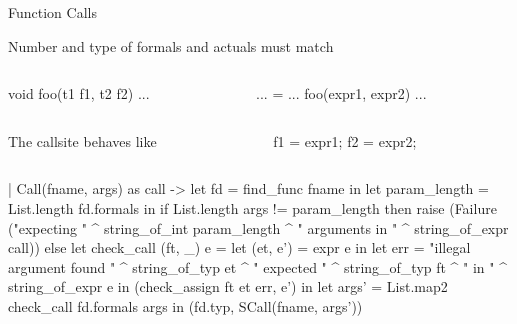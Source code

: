 \documentclass{plt}
\begin{document}
\begin{frame}[fragile=singleslide]{Function Calls}

Number and type of formals and actuals must match

\begin{columns}
\begin{column}{0.5\textwidth}
\begin{C}
void foo(t1 f1, t2 f2) { ... }
\end{C}
\end{column}
\begin{column}{0.5\textwidth}
\begin{C}
... = ... foo(expr1, expr2) ...
\end{C}
\end{column}
\end{columns}

\begin{columns}
\begin{column}{0.4\textwidth}
The callsite behaves like
\end{column}
\begin{column}{0.6\textwidth}
\begin{C}
f1 = expr1;
f2 = expr2;
\end{C}
\end{column}
\end{columns}

\begin{ocaml}
| Call(fname, args) as call -> 
    let fd = find_func fname in
    let param_length = List.length fd.formals in
    if List.length args != param_length then
      raise (Failure ("expecting " ^ string_of_int param_length ^ 
                      " arguments in " ^ string_of_expr call))
    else let check_call (ft, _) e = 
      let (et, e') = expr e in 
      let err = "illegal argument found " ^ string_of_typ et ^
        " expected " ^ string_of_typ ft ^ " in " ^ string_of_expr e
      in (check_assign ft et err, e')
    in 
    let args' = List.map2 check_call fd.formals args
    in (fd.typ, SCall(fname, args'))
\end{ocaml}
\end{frame}
\end{document}
